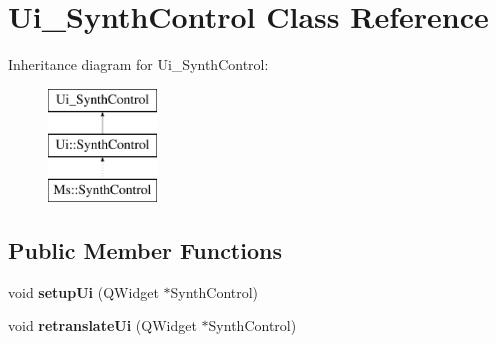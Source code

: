 \hypertarget{class_ui___synth_control}{}\section{Ui\+\_\+\+Synth\+Control Class Reference}
\label{class_ui___synth_control}
Inheritance diagram for Ui\+\_\+\+Synth\+Control\+:\begin{figure}[H]
\begin{center}
\leavevmode
\includegraphics[height=3.000000cm]{class_ui___synth_control}
\end{center}
\end{figure}
\subsection*{Public Member Functions}
\begin{DoxyCompactItemize}
\item 
\mbox{\label{class_ui___synth_control_a2bd6b471708761d69c1a8ed298ef5f2e}} 
void {\bfseries setup\+Ui} (Q\+Widget $\ast$Synth\+Control)
\item 
\mbox{\label{class_ui___synth_control_afb40e74512fdb2bd9f3daeba27a72b1d}} 
void {\bfseries retranslate\+Ui} (Q\+Widget $\ast$Synth\+Control)
\end{DoxyCompactItemize}
